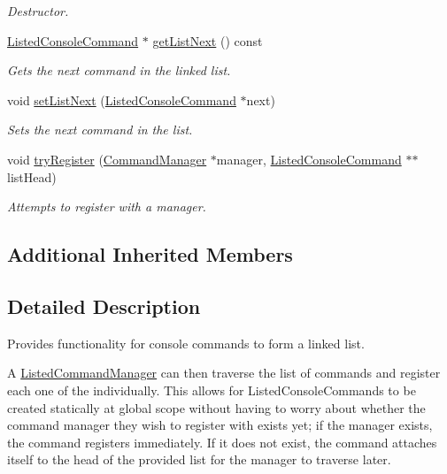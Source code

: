 \begin{DoxyCompactItemize}
\begin{DoxyCompactList}\small\item\em Destructor. \end{DoxyCompactList}\item 
\hyperlink{class_listed_console_command}{Listed\-Console\-Command} $\ast$ \hyperlink{class_listed_console_command_a84c311e9f2a70e9672b63f1da43ee0d2}{get\-List\-Next} () const 
\begin{DoxyCompactList}\small\item\em Gets the next command in the linked list. \end{DoxyCompactList}\item 
void \hyperlink{class_listed_console_command_ab14e1f1af33cef14d5a3b450ef44a31d}{set\-List\-Next} (\hyperlink{class_listed_console_command}{Listed\-Console\-Command} $\ast$next)
\begin{DoxyCompactList}\small\item\em Sets the next command in the list. \end{DoxyCompactList}\item 
void \hyperlink{class_listed_console_command_a93828e08528c3a63811520369ea391db}{try\-Register} (\hyperlink{class_command_manager}{Command\-Manager} $\ast$manager, \hyperlink{class_listed_console_command}{Listed\-Console\-Command} $\ast$$\ast$list\-Head)
\begin{DoxyCompactList}\small\item\em Attempts to register with a manager. \end{DoxyCompactList}\end{DoxyCompactItemize}
\subsection*{Additional Inherited Members}


\subsection{Detailed Description}
Provides functionality for console commands to form a linked list. 

A \hyperlink{class_listed_command_manager}{Listed\-Command\-Manager} can then traverse the list of commands and register each one of the individually. This allows for Listed\-Console\-Commands to be created statically at global scope without having to worry about whether the command manager they wish to register with exists yet; if the manager exists, the command registers immediately. If it does not exist, the command attaches itself to the head of the provided list for the manager to traverse later. 

